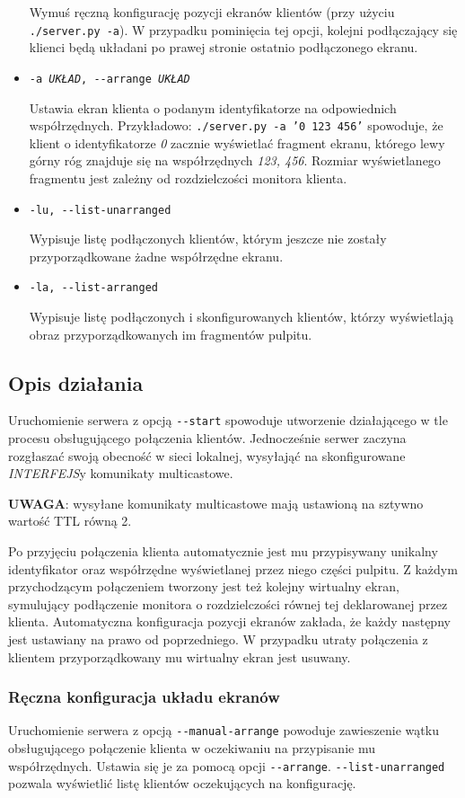 \begin{itemize}
      Wymuś ręczną konfigurację pozycji ekranów klientów (przy użyciu \texttt{./server.py -a}). W przypadku pominięcia tej opcji, kolejni podłączający się klienci będą układani po prawej stronie ostatnio podłączonego ekranu.

    \item \texttt{-a \emph{UKŁAD}, -{}-arrange \emph{UKŁAD}}

      Ustawia ekran klienta o podanym identyfikatorze na odpowiednich współrzędnych. Przykładowo: \texttt{./server.py -a '0 123 456'} spowoduje, że klient o identyfikatorze \emph{0} zacznie wyświetlać fragment ekranu, którego lewy górny róg znajduje się na współrzędnych \emph{123, 456}. Rozmiar wyświetlanego fragmentu jest zależny od rozdzielczości monitora klienta.

    \item \texttt{-lu, -{}-list-unarranged}

      Wypisuje listę podłączonych klientów, którym jeszcze nie zostały przyporządkowane żadne współrzędne ekranu.

    \item \texttt{-la, -{}-list-arranged}

      Wypisuje listę podłączonych i skonfigurowanych klientów, którzy wyświetlają obraz przyporządkowanych im fragmentów pulpitu.

  \end{itemize}

  \subsection{Opis działania}
    Uruchomienie serwera z opcją \texttt{-{}-start} spowoduje utworzenie działającego w tle procesu obsługującego połączenia klientów. Jednocześnie serwer zaczyna rozgłaszać swoją obecność w sieci lokalnej, wysyłająć na skonfigurowane \emph{INTERFEJS}y komunikaty multicastowe.

    \textbf{UWAGA}: wysyłane komunikaty multicastowe mają ustawioną na sztywno wartość TTL równą 2.

    Po przyjęciu połączenia klienta automatycznie jest mu przypisywany unikalny identyfikator oraz współrzędne wyświetlanej przez niego części pulpitu. Z każdym przychodzącym połączeniem tworzony jest też kolejny wirtualny ekran, symulujący podłączenie monitora o rozdzielczości równej tej deklarowanej przez klienta. Automatyczna konfiguracja pozycji ekranów zakłada, że każdy następny jest ustawiany na prawo od poprzedniego.
    W przypadku utraty połączenia z klientem przyporządkowany mu wirtualny ekran jest usuwany.

    \subsubsection{\label{sec:ManualConfig}Ręczna konfiguracja układu ekranów}
      Uruchomienie serwera z opcją \texttt{-{}-manual-arrange} powoduje zawieszenie wątku obsługującego połączenie klienta w oczekiwaniu na przypisanie mu współrzędnych. Ustawia się je za pomocą opcji \texttt{-{}-arrange}. \texttt{-{}-list-unarranged} pozwala wyświetlić listę klientów oczekujących na konfigurację.


